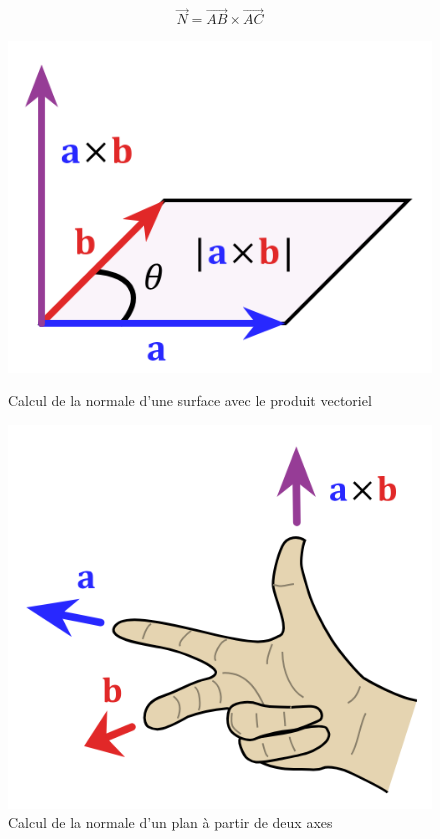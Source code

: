 \begin{align*} 
\vec{N} = \vec{AB} \times \vec{AC}
\end{align*}

\begin{figure}[h]
  \begin{minipage}[b]{0.45\linewidth}
    \centering
    \includegraphics[width=\linewidth]{images//shaders/crossprod00.png}
    \caption{Calcul de la normale d'une surface avec le produit vectoriel}
    \label{crossprod00}
  \end{minipage}
  \hspace{0.1\linewidth} %
  \begin{minipage}[b]{0.45\linewidth}
    \centering
    \includegraphics[width=\linewidth]{images//shaders/crossprod01.png}
    \caption{Calcul de la normale d'un plan à partir de deux axes}
    \label{crossprod01}
  \end{minipage}
\end{figure}


